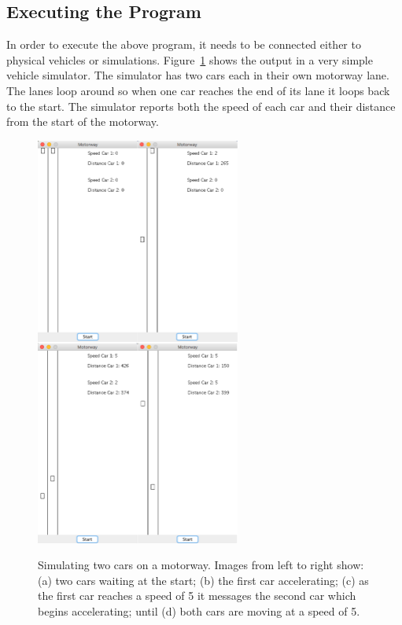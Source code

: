 \subsection{Executing the Program}
%
In order to execute the above program, it needs to be connected either
to physical vehicles or simulations.  Figure~\ref{fig:motorwaysim}
shows the output in a very simple vehicle simulator.  The simulator
has two cars each in their own motorway lane.  The lanes loop around
so when one car reaches the end of its lane it loops back to the
start.  The simulator reports both the speed of each car and their
distance from the start of the motorway.

\begin{figure}
\begin{center}
\includegraphics[width=0.6\textwidth]{motorwaysim.png}
\caption{Simulating two cars on a motorway. Images from left to right
  show:\\{} (a) two cars waiting at the start; (b) the first car
  accelerating; (c) as the first car reaches a speed of 5 it messages
  the second car which begins accelerating; until (d) both cars are
  moving at a speed of 5.}
\label{fig:motorwaysim}
\end{center}
\end{figure}

